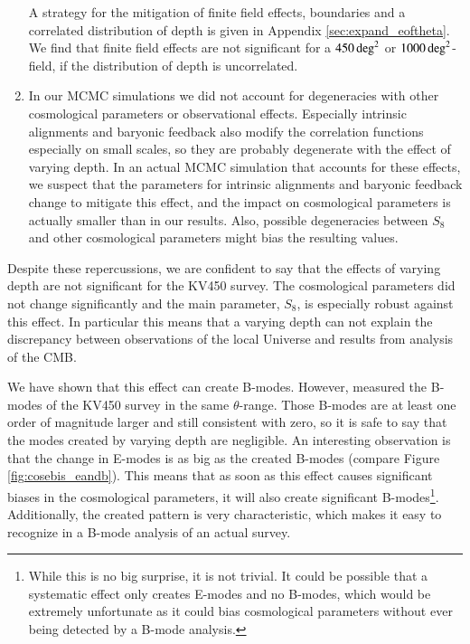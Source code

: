 \begin{enumerate}
A strategy for the mitigation of finite field effects, boundaries and a correlated distribution of depth is given in Appendix \ref{sec:expand_eoftheta}. We find that finite field effects are not significant for a $450\,\rm{deg}^2$ or $1000\,\rm{deg}^2$-field, if the distribution of depth is uncorrelated.

\item In our MCMC simulations we did not account for degeneracies with other cosmological parameters
 or observational effects. Especially intrinsic alignments and baryonic feedback also modify the correlation functions especially on small scales, so they are probably degenerate with the effect of varying depth. In an actual MCMC simulation that accounts for these effects, we suspect that the parameters for intrinsic alignments and baryonic feedback change to mitigate this effect, and the impact on cosmological parameters is actually smaller than in our results. Also, possible degeneracies between $S_8$ and other cosmological parameters might bias the resulting values. %
\end{enumerate}

Despite these repercussions, we are confident to say that the effects of varying depth are not significant for the KV450 survey. The cosmological parameters did not change significantly and the main parameter, $S_8$, is especially robust against this effect. In particular this means that a varying depth can not explain the discrepancy between observations of the local Universe and results from analysis of the CMB.

We have shown that this effect can create B-modes. However, \citet{2018arXiv181002353A} measured the B-modes of the KV450 survey in the same $\theta$-range. Those B-modes are at least one order of magnitude larger and still consistent with zero, so it is safe to say that the modes created by varying depth are negligible. An interesting observation is that the change in E-modes is as big as the created B-modes (compare Figure \ref{fig:cosebis_eandb}). This means that as soon as this effect causes significant biases in the cosmological parameters, it will also create significant B-modes\footnote{While this is no big surprise, it is not trivial. It could be possible that a systematic effect only creates E-modes and no B-modes, which would be extremely unfortunate as it could bias cosmological parameters without ever being detected by a B-mode analysis.}. Additionally, the created pattern is very characteristic, which makes it easy to recognize in a B-mode analysis of an actual survey.

